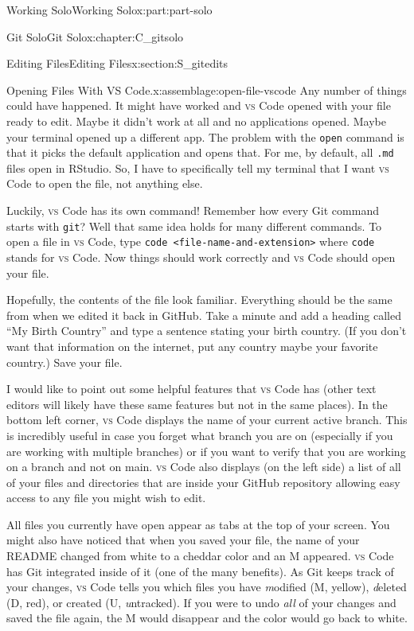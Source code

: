 \documentclass[oneside,10pt,]{book}
\newcommand{\mono}[1]{\texttt{#1}}
\newcommand{\initialism}[1]{\textsc{\MakeLowercase{#1}}}
\DeclareRobustCommand{\initialismintitle}[1]{\texorpdfstring{#1}{#1}}
\begin{document}
\begin{partptx}{Working Solo}{}{Working Solo}{}{}{x:part:part-solo}
\begin{chapterptx}{Git Solo}{}{Git Solo}{}{}{x:chapter:C_gitsolo}
\begin{sectionptx}{Editing Files}{}{Editing Files}{}{}{x:section:S_gitedits}
\begin{assemblage}{Opening Files With \initialismintitle{VS} Code.}{x:assemblage:open-file-vscode}
Any number of things could have happened. It might have worked and \initialism{VS} Code opened with your file ready to edit. Maybe it didn't work at all and no applications opened. Maybe your terminal opened up a different app. The problem with the \mono{open} command is that it picks the default application and opens that. For me, by default, all \mono{.md} files open in RStudio. So, I have to specifically tell my terminal that I want \initialism{VS} Code to open the file, not anything else.%
\par
Luckily, \initialism{VS} Code has its own command! Remember how every Git command starts with \mono{git}? Well that same idea holds for many different commands. To open a file in \initialism{VS} Code, type \mono{code <file-name-and-extension>} where \mono{code} stands for \initialism{VS} Code. Now things should work correctly and \initialism{VS} Code should open your file.%
\end{assemblage}
Hopefully, the contents of the file look familiar. Everything should be the same from when we edited it back in GitHub. Take a minute and add a heading called ``My Birth Country'' and type a sentence stating your birth country. (If you don't want that information on the internet, put any country \textellipsis{} maybe your favorite country.) Save your file.%
\par
I would like to point out some helpful features that \initialism{VS} Code has (other text editors will likely have these same features but not in the same places). In the bottom left corner, \initialism{VS} Code displays the name of your current active branch. This is incredibly useful in case you forget what branch you are on (especially if you are working with multiple branches) or if you want to verify that you are working on a branch and not on main. \initialism{VS} Code also displays (on the left side) a list of all of your files and directories that are inside your GitHub repository allowing easy access to any file you might wish to edit.%
\par
All files you currently have open appear as tabs at the top of your screen. You might also have noticed that when you saved your file, the name of your README changed from white to a cheddar color and an M appeared. \initialism{VS} Code has Git integrated inside of it (one of the many benefits). As Git keeps track of your changes, \initialism{VS} Code tells you which files you have \emph{m}odified (M, yellow), \emph{d}eleted (D, red), or created (U, \emph{u}ntracked). If you were to undo \emph{all} of your changes and saved the file again, the M would disappear and the color would go back to white.%

\end{sectionptx}
\end{chapterptx}
\end{partptx}
\end{document}
